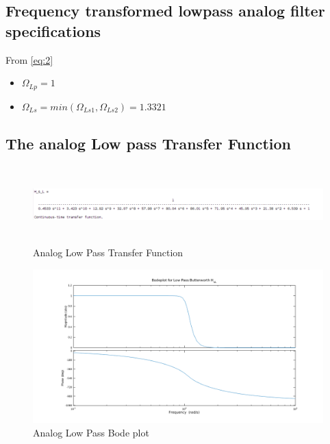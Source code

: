 \documentclass[22pt]{article}
\begin{document}
\subsection{Frequency transformed lowpass analog filter specifications}
From \ref{eq:2}
\begin{itemize}
\item $\Omega_{Lp} = 1$
\item $\Omega_{Ls} = min(\Omega_{Ls1},\Omega_{Ls2}) = 1.3321$
\end{itemize}

\subsection{The analog Low pass Transfer Function}
\begin{figure}[H]
  \centering
  \includegraphics[width=1.2\textwidth, height=3cm]{images/Analog_but_lp_tf}
  \caption{Analog Low Pass Transfer Function }
  \label{fig:1}
\end{figure}
\begin{figure}[H]
  \centering
  \includegraphics[scale=0.5]{images/Bodeplot_but_lp}
  \caption{Analog Low Pass Bode plot}
  \label{fig:2}
\end{figure}
\end{document}
